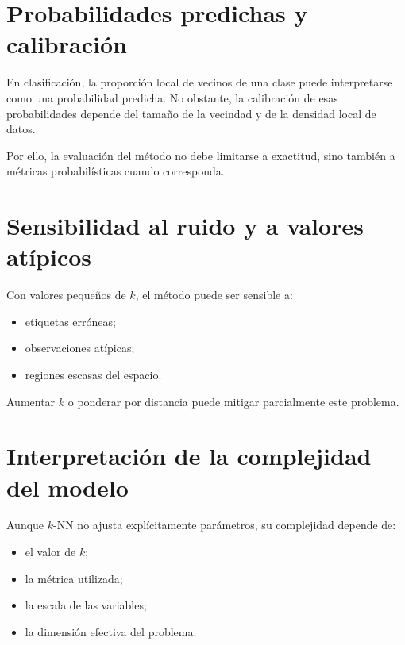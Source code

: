 \documentclass[
  spanish,
  10.5pt,
  letterpaper,
  DIV=11,
  numbers=noendperiod,
  oneside,
  open=any]{scrreprt}
\providecommand{\tightlist}{%
  \setlength{\itemsep}{0pt}\setlength{\parskip}{0pt}}
\theoremstyle{definition}
\theoremstyle{definition}
\theoremstyle{plain}
\theoremstyle{remark}
\begin{document}
\section*{Probabilidades predichas y
calibración}\label{probabilidades-predichas-y-calibraciuxf3n}


En clasificación, la proporción local de vecinos de una clase puede
interpretarse como una probabilidad predicha. No obstante, la
calibración de esas probabilidades depende del tamaño de la vecindad y
de la densidad local de datos.

Por ello, la evaluación del método no debe limitarse a exactitud, sino
también a métricas probabilísticas cuando corresponda.

\section*{Sensibilidad al ruido y a valores
atípicos}\label{sensibilidad-al-ruido-y-a-valores-atuxedpicos}


Con valores pequeños de \(k\), el método puede ser sensible a:

\begin{itemize}
\tightlist
\item
  etiquetas erróneas;
\item
  observaciones atípicas;
\item
  regiones escasas del espacio.
\end{itemize}

Aumentar \(k\) o ponderar por distancia puede mitigar parcialmente este
problema.

\section*{Interpretación de la complejidad del
modelo}\label{interpretaciuxf3n-de-la-complejidad-del-modelo}


Aunque \(k\)-NN no ajusta explícitamente parámetros, su complejidad
depende de:

\begin{itemize}
\tightlist
\item
  el valor de \(k\);
\item
  la métrica utilizada;
\item
  la escala de las variables;
\item
  la dimensión efectiva del problema.
\end{itemize}
\end{document}
